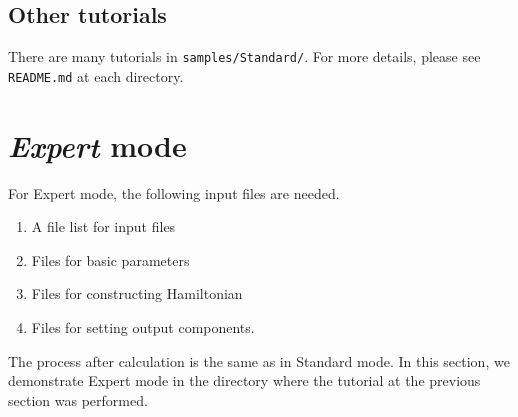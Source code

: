 \subsection{Other tutorials}

There are many tutorials in \verb|samples/Standard/|.
For more details, please see \verb|README.md| at each directory.

\section{{\it Expert} mode}
For Expert mode, the following input files are needed.
\begin{enumerate}
\item A file list for input files
\item Files for basic parameters
\item Files for constructing Hamiltonian
\item Files for setting output components.
\end{enumerate}
The process after calculation is the same as in Standard mode.
In this section, we demonstrate Expert mode in the directory where
the tutorial at the previous section was performed.

